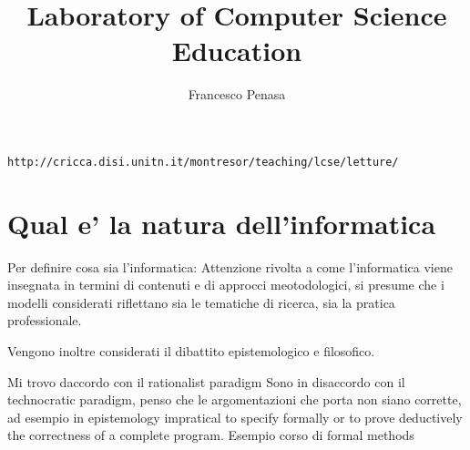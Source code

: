 \documentclass[11pt]{article}
\begin{document}
\author{Francesco Penasa}
\title{Laboratory of Computer Science Education}
\maketitle

\medskip

\texttt{http://cricca.disi.unitn.it/montresor/teaching/lcse/letture/}\\

\section{Qual e' la natura dell'informatica} %
\label{sec:qual}
Per definire cosa sia l'informatica:
Attenzione rivolta a come l'informatica viene insegnata in termini di contenuti e di approcci meotodologici, si presume che i modelli considerati riflettano sia le tematiche di ricerca, sia la pratica professionale.

Vengono inoltre considerati il dibattito epistemologico e filosofico.

Mi trovo daccordo con il rationalist paradigm 
Sono in disaccordo con il technocratic paradigm, penso che le argomentazioni che porta non siano corrette, ad esempio in epistemology impratical to specify formally or to prove deductively the correctness of a complete program. Esempio corso di formal methods  
\end{document}
